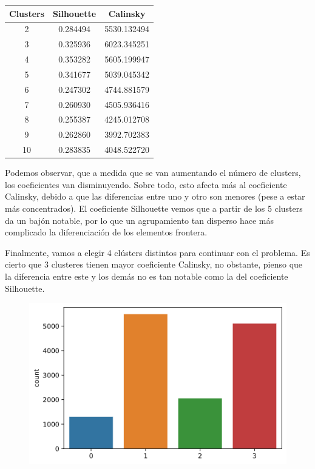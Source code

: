 \documentclass[11pt,a4paper]{article}
\begin{document}
\begin{table}[H]
    \centering
    \begin{tabular}{|c|c|c|}
    \hline
    \textbf{Clusters} & \textbf{Silhouette} & \textbf{Calinsky} \\ \hline
    2 & 0.284494 & 5530.132494 \\ \hline
    3 & 0.325936 & 6023.345251 \\ \hline
    4 & 0.353282 & 5605.199947 \\ \hline
    5 & 0.341677 & 5039.045342 \\ \hline
    6 & 0.247302 & 4744.881579 \\ \hline
    7 & 0.260930 & 4505.936416 \\ \hline
    8 & 0.255387 & 4245.012708 \\ \hline
    9 & 0.262860 & 3992.702383 \\ \hline
    10 & 0.283835 & 4048.522720 \\ \hline
    \end{tabular}
\end{table}

Podemos observar, que a medida que se van aumentando el número de clusters, los coeficientes van disminuyendo. Sobre todo, esto
afecta más al coeficiente Calinsky, debido a que las diferencias entre uno y otro son menores (pese a estar más concentrados). El
coeficiente Silhouette vemos que a partir de los 5 clusters da un bajón notable, por lo que un agrupamiento tan disperso hace más
complicado la diferenciación de los elementos frontera.

Finalmente, vamos a elegir 4 clústers distintos para continuar con el problema. Es cierto que 3 clusteres tienen mayor coeficiente
Calinsky, no obstante, pienso que la diferencia entre este y los demás no es tan notable como la del coeficiente Silhouette.

\begin{figure}[H]
    \centering
    \includegraphics[scale=0.4]{img/cluster-distribution-and.png}
\end{figure}
\end{document}

